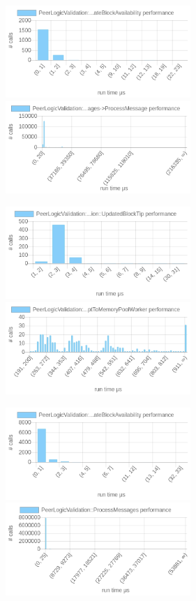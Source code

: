 \documentclass{article}
\begin{document}
\includegraphics[width=7cm]{images/london/chartPeerLogicValidation_3A_3AProcessMessages-_3EProcessMessage-_3EUpdateBlockAvailability.png}
\includegraphics[width=7cm]{images/london/chartPeerLogicValidation_3A_3AProcessMessages-_3EProcessMessage.png}

\includegraphics[width=7cm]{images/london/chartPeerLogicValidation_3A_3AProcessMessages-_3EProcessMessage-_3EProcessMessage-_3EPeerLogicValidation_3A_3AUpdatedBlockTip.png}
\includegraphics[width=7cm]{images/london/chartPeerLogicValidation_3A_3AProcessMessages-_3EProcessMessage-_3EAcceptToMemoryPoolWithTime-_3EAcceptToMemoryPoolWorker.png}

\includegraphics[width=7cm]{images/london/chartPeerLogicValidation_3A_3AProcessMessages-_3EProcessMessage-_3EProcessHeadersMessage-_3EUpdateBlockAvailability.png}
\includegraphics[width=7cm]{images/london/chartPeerLogicValidation_3A_3AProcessMessages.png}
\end{document}
